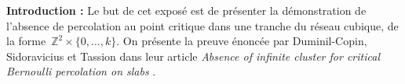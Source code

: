 \vspace*{0.3cm}
\begin{center}
\begin{minipage}{0.85\textwidth}
	\textbf{Introduction :}
	Le but de cet exposé est de présenter la démonstration de l'absence de percolation au point critique dans une tranche du réseau cubique, de la forme~$\mathbb{Z}^2\times\{0,...,k\}$. On présente la preuve énoncée par Duminil-Copin, Sidoravicius et Tassion dans leur article \emph{Absence of infinite cluster for critical Bernoulli percolation on slabs} \cite{main}.
\end{minipage}
\end{center}
